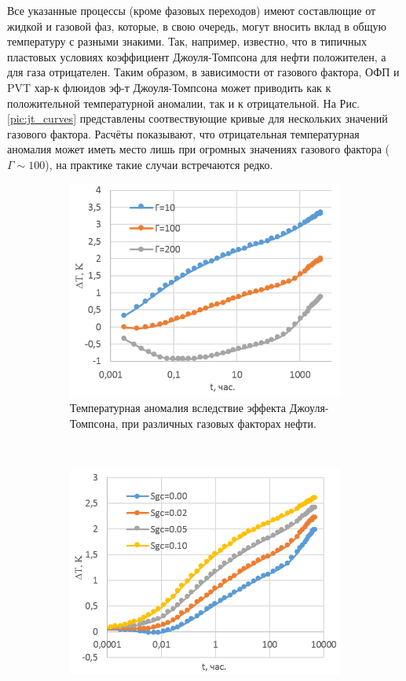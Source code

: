 	Все указанные процессы (кроме фазовых переходов) имеют составлющие от жидкой и газовой фаз, которые, в свою очередь, могут вносить вклад в общую температуру с разными знакими. Так, например, известно, что в типичных пластовых условиях коэффициент Джоуля-Томпсона для нефти положителен, а для газа отрицателен. Таким образом, в зависимости от газового фактора, ОФП и PVT хар-к флюидов эф-т Джоуля-Томпсона может приводить как к положительной температурной аномалии, так и к отрицательной. На Рис. \ref{pic:jt_curves} представлены соотвествующие кривые для нескольких значений газового фактора. Расчёты показывают, что отрицательная температурная аномалия может иметь место лишь при огромных значениях газового фактора ($\Gamma \sim 100$), 
на практике такие случаи встречаются редко.
\begin{figure}[H]
	\begin{subfigure}[b]{0.5\textwidth}
	\centering
	\includegraphics[width=1\textwidth]{pic/gas_factor.png}
	\caption{Температурная аномалия вследствие эффекта Джоуля-Томпсона, при различных газовых факторах нефти.}
	\label{pic:gas_factor}
	\end{subfigure}
~
	\begin{subfigure}[b]{0.5\textwidth}
		\centering
		\includegraphics[width=1\textwidth]{pic/critical_gas.png}

\end{subfigure}
\end{figure}
